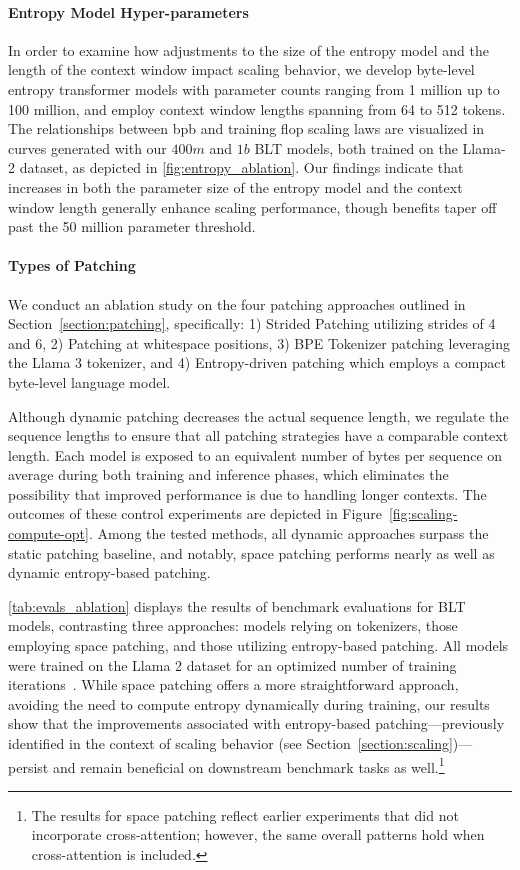 \paragraph{Entropy Model Hyper-parameters} In order to examine how adjustments to the size of the entropy model and the length of the context window impact scaling behavior, we develop byte-level entropy transformer models with parameter counts ranging from 1 million up to 100 million, and employ context window lengths spanning from 64 to 512 tokens. The relationships between bpb and training flop scaling laws are visualized in curves generated with our $400m$ and $1b$ {\textsc BLT} models, both trained on the Llama-2 dataset, as depicted in \autoref{fig:entropy_ablation}. Our findings indicate that increases in both the parameter size of the entropy model and the context window length generally enhance scaling performance, though benefits taper off past the 50 million parameter threshold.

\paragraph{Types of Patching}

We conduct an ablation study on the four patching approaches outlined in Section~\ref{section:patching}, specifically: 1) Strided Patching utilizing strides of 4 and 6, 2) Patching at whitespace positions, 3) BPE Tokenizer patching leveraging the Llama 3 tokenizer, and 4) Entropy-driven patching which employs a compact byte-level language model.

Although dynamic patching decreases the actual sequence length, we regulate the sequence lengths to ensure that all patching strategies have a comparable context length. Each model is exposed to an equivalent number of bytes per sequence on average during both training and inference phases, which eliminates the possibility that improved performance is due to handling longer contexts. The outcomes of these control experiments are depicted in Figure~\ref{fig:scaling-compute-opt}. Among the tested methods, all dynamic approaches surpass the static patching baseline, and notably, space patching performs nearly as well as dynamic entropy-based patching.

\autoref{tab:evals_ablation} displays the results of benchmark evaluations for {\textsc BLT} models, contrasting three approaches: models relying on tokenizers, those employing space patching, and those utilizing entropy-based patching. All models were trained on the Llama 2 dataset for an optimized number of training iterations~\citep{dubey2024llama}. While space patching offers a more straightforward approach, avoiding the need to compute entropy dynamically during training, our results show that the improvements associated with entropy-based patching—previously identified in the context of scaling behavior (see Section~\ref{section:scaling})—persist and remain beneficial on downstream benchmark tasks as well.\footnote{The results for space patching reflect earlier experiments that did not incorporate cross-attention; however, the same overall patterns hold when cross-attention is included.}

